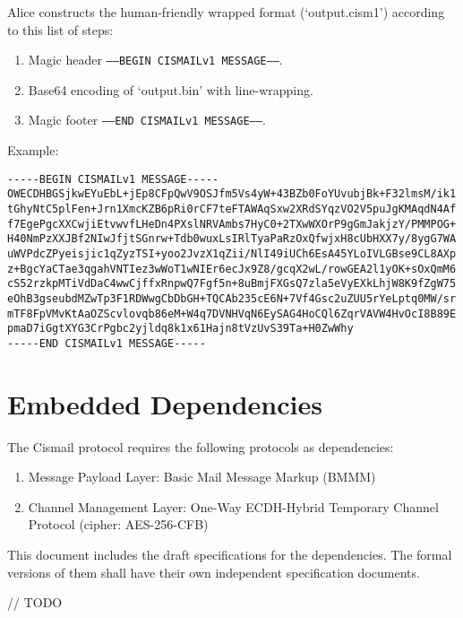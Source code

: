 \documentclass[a4paper,11pt]{article}
\begin{document}
Alice constructs the human-friendly wrapped format (`output.cism1') according to this list of steps:

\begin{enumerate}
	\item Magic header \texttt{-----BEGIN CISMAILv1 MESSAGE-----}.
	\item Base64 encoding of `output.bin' with line-wrapping.
	\item Magic footer \texttt{-----END CISMAILv1 MESSAGE-----}.
\end{enumerate}

Example:

\begin{lstlisting}
-----BEGIN CISMAILv1 MESSAGE-----
OWECDHBGSjkwEYuEbL+jEp8CFpQwV9OSJfm5Vs4yW+43BZb0FoYUvubjBk+F32lmsM/ik1
tGhyNtC5plFen+Jrn1XmcKZB6pRi0rCF7teFTAWAqSxw2XRdSYqzVO2V5puJgKMAqdN4Af
f7EgePgcXXCwjiEtvwvfLHeDn4PXslNRVAmbs7HyC0+2TXwWXOrP9gGmJakjzY/PMMPOG+
H40NmPzXXJBf2NIwJfjtSGnrw+Tdb0wuxLsIRlTyaPaRzOxQfwjxH8cUbHXX7y/8ygG7WA
uWVPdcZPyeisjic1qZyzTSI+yoo2JvzX1qZii/NlI49iUCh6EsA45YLoIVLGBse9CL8AXp
z+BgcYaCTae3qgahVNTIez3wWoT1wNIEr6ecJx9Z8/gcqX2wL/rowGEA2l1yOK+sOxQmM6
cS52rzkpMTiVdDaC4wwCjffxRnpwQ7Fgf5n+8uBmjFXGsQ7zla5eVyEXkLhjW8K9fZgW75
eOhB3gseubdMZwTp3F1RDWwgCbDbGH+TQCAb235cE6N+7Vf4Gsc2uZUU5rYeLptq0MW/sr
mTF8FpVMvKtAaOZScvlovqb86eM+W4q7DVNHVqN6EySAG4HoCQl6ZqrVAVW4HvOcI8B89E
pmaD7iGgtXYG3CrPgbc2yjldq8k1x61Hajn8tVzUvS39Ta+H0ZwWhy
-----END CISMAILv1 MESSAGE-----
\end{lstlisting}






\section{Embedded Dependencies}

The Cismail protocol requires the following protocols as dependencies:

\begin{enumerate}
	\item Message Payload Layer: Basic Mail Message Markup (BMMM)
	\item Channel Management Layer: One-Way ECDH-Hybrid Temporary Channel Protocol (cipher: AES-256-CFB)
\end{enumerate}

This document includes the draft specifications for the dependencies.
The formal versions of them shall have their own independent specification documents.

// TODO

\end{document}
